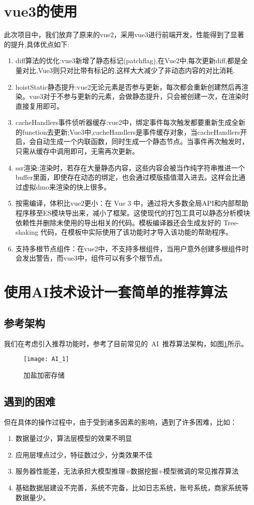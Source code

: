 \section{vue3的使用}
此次项目中，我们放弃了原来的vue2，采用vue3进行前端开发，性能得到了显著的提升,具体优点如下:
\begin{enumerate}
	\item {diff算法的优化}:vue3新增了静态标记(patchflag),在Vue2中,每次更新diff,都是全量对比,Vue3则只对比带有标记的,这样大大减少了非动态内容的对比消耗.
	\item {hoistStatic静态提升}:vue2无论元素是否参与更新，每次都会重新创建然后再渲染。vue3对于不参与更新的元素，会做静态提升，只会被创建一次，在渲染时直接复用即可。
	\item {cacheHandlers事件侦听器缓存}:vue2中，绑定事件每次触发都要重新生成全新的function去更新;Vue3中,cacheHandlers是事件缓存对象，当cacheHandlers开启，会自动生成一个内联函数，同时生成一个静态节点。当事件再次触发时，只需从缓存中调用即可，无需再次更新。
	\item {ssr渲染}:渲染时，若存在大量静态内容，这些内容会被当作纯字符串推进一个buffer里面，即使存在动态的绑定，也会通过模版插值潜入进去。这样会比通过虚拟dmo来渲染的快上很多。
	\item {按需编译，体积比vue2更小}：在 Vue 3 中，通过将大多数全局API和内部帮助程序移至ES模块导出来，减小了框架。这使现代的打包工具可以静态分析模块依赖性并删除未使用的导出相关的代码。模板编译器还会生成友好的 Tree-shaking 代码，在模板中实际使用了该功能时才导入该功能的帮助程序。
	\item {支持多根节点组件}：在vue2中，不支持多根组件，当用户意外创建多根组件时会发出警告，而vue3中，组件可以有多个根节点。
\end{enumerate}

\section{使用AI技术设计一套简单的推荐算法}
\subsection{参考架构}
我们在考虑引入推荐功能时，参考了目前常见的~AI~推荐算法架构，如图\ref{fig:AI_1}所示。
\begin{figure}[htbp]
	\centering
	\texttt{[image: AI\_1]}
	\caption{加盐加密存储}
	\label{fig:AI_1}
	\vspace{\baselineskip}
\end{figure}

\subsection{遇到的困难}
但在具体的操作过程中，由于受到诸多因素的影响，遇到了许多困难，比如：
\begin{enumerate}
	\item 数据量过少，算法层模型的效果不明显
	\item 应用层埋点过少，特征数过少，分类效果不佳
	\item 服务器性能差，无法承担大模型推理+数据挖掘+模型微调的常见推荐算法
	\item 基础数据层建设不完善，系统不完备，比如日志系统，账号系统，商家系统等数据量少。
\end{enumerate}
